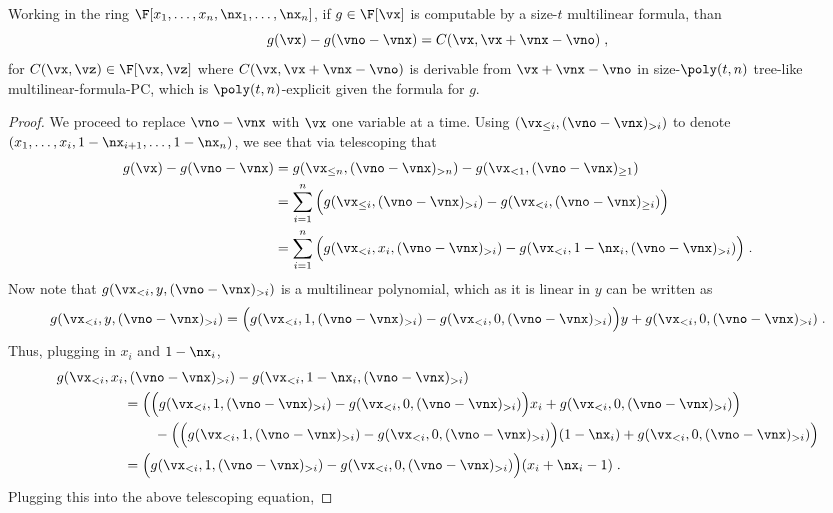 \documentclass{toc}
\begin{document}
\begin{lemma}\label{res:mult-form-PC:form-form}
        Working in the ring $\F[x_1,\ldots,x_n,\nx_1,\ldots,\nx_n]$, if $g\in\F[\vx]$ is computable by a size-$t$ multilinear formula, than
        \[
                g(\vx)-g(\vno-\vnx)=C(\vx,\vx+\vnx-\vno)
                \;,
        \]
        for $C(\vx,\vz)\in\F[\vx,\vz]$ where $C(\vx,\vx+\vnx-\vno)$ is derivable from $\vx+\vnx-\vno$ in size-$\poly(t,n)$ tree-like multilinear-formula-PC, which is $\poly(t,n)$-explicit given the formula for $g$.
\end{lemma}
\begin{proof}
        We proceed to replace $\vno-\vnx$ with $\vx$ one variable at a time.  Using $(\vx_{\le i},(\vno-\vnx)_{>i})$ to denote $(x_1,\ldots,x_i,1-\nx_{i+1},\ldots,1-\nx_{n})$, we see that via telescoping that
        \begin{align*}
                g(\vx)-g(\vno-\vnx)
                &=g(\vx_{\le n},(\vno-\vnx)_{>n})-g(\vx_{<1},(\vno-\vnx)_{\ge 1})\\
                &=\sum_{i=1}^n \Big (g(\vx_{\le i},(\vno-\vnx)_{>i}) - g(\vx_{<i},(\vno-\vnx)_{\ge i})\Big)\\
                &=\sum_{i=1}^n \Big (g(\vx_{<i},x_i,(\vno-\vnx)_{>i}) - g(\vx_{<i},1-\nx_i,(\vno-\vnx)_{> i})\Big)
                \;.
        \end{align*}
        Now note that $g(\vx_{<i},y,(\vno-\vnx)_{>i})$ is a multilinear polynomial, which as it is linear in $y$ can be written as
        \[
                g(\vx_{<i},y,(\vno-\vnx)_{>i})=\Big(g(\vx_{<i},1,(\vno-\vnx)_{>i})-g(\vx_{<i},0,(\vno-\vnx)_{>i})\Big)y+g(\vx_{<i},0,(\vno-\vnx)_{>i})
                \;.
        \]
        Thus, plugging in $x_i$ and $1-\nx_i$,
        \begin{align*}
                g(\vx_{<i},x_i&,(\vno-\vnx)_{>i})-g(\vx_{<i},1-\nx_i,(\vno-\vnx)_{>i})\\
                &=\left(\Big(g(\vx_{<i},1,(\vno-\vnx)_{>i})-g(\vx_{<i},0,(\vno-\vnx)_{>i})\Big)x_i+g(\vx_{<i},0,(\vno-\vnx)_{>i})\right)\\
                &\hspace{.3in}-\left(\Big(g(\vx_{<i},1,(\vno-\vnx)_{>i})-g(\vx_{<i},0,(\vno-\vnx)_{>i})\Big)(1-\nx_i)+g(\vx_{<i},0,(\vno-\vnx)_{>i})\right)\\
                &=\Big(g(\vx_{<i},1,(\vno-\vnx)_{>i})-g(\vx_{<i},0,(\vno-\vnx)_{>i})\Big)(x_i+\nx_i-1)
                \;.
        \end{align*}
        Plugging this into the above telescoping equation,

\end{proof}
\end{document}
